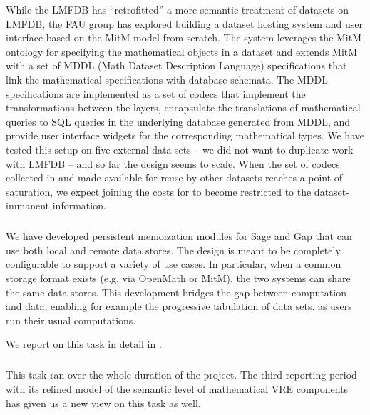 While the LMFDB has ``retrofitted'' a more semantic treatment of datasets on LMFDB, the FAU group has explored building a dataset hosting system and user interface based on the MitM model from scratch.
The \dmh system leverages the MitM ontology for specifying the mathematical objects in a dataset and extends MitM with a set of MDDL (Math Dataset Description Language) specifications that link the mathematical specifications with database schemata.
The MDDL specifications are implemented as a set of codecs that implement the transformations between the layers, encapsulate the translations of mathematical queries to SQL queries in the underlying database generated from MDDL, and provide user interface widgets for the corresponding mathematical types.
We have tested this setup on five external data sets -- we did not want to duplicate work with LMFDB -- and so far the \dmh design seems to scale.
When the set of codecs collected in \dmh and made available for reuse by other datasets reaches a point of saturation, we expect joining the costs for \dmh to become restricted to the dataset-immanent information.
\medskip

\subparagraph{}
\label{dksbases@data-memo}
We have developed persistent memoization modules for Sage and Gap that can use both local and remote data stores.
The design is meant to be completely configurable to support a variety of use cases. In particular,
when a common storage format exists (e.g. via OpenMath or MitM), the two systems can share the same data stores.
This development bridges the gap between computation and data, enabling for example the progressive tabulation of data sets.
as users run their usual computations.

We report on this task in detail in .
\medskip

\subparagraph{}
This task ran over the whole duration of the \pn project. The third reporting period with its refined model of the semantic level of mathematical VRE components has given us a new view on this task as well.

